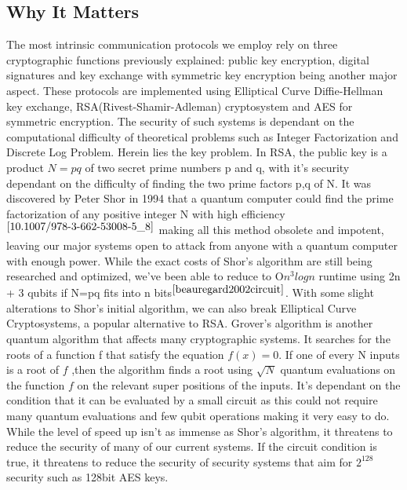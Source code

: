 \documentclass[10pt,a4paper]{IEEEtran}
\begin{document}
\subsection{Why It Matters}
The most intrinsic communication protocols we employ rely on three cryptographic functions previously explained: public key encryption, digital signatures and key exchange with symmetric key encryption being another major aspect. These protocols are implemented using Elliptical Curve Diffie-Hellman key exchange, RSA(Rivest-Shamir-Adleman) cryptosystem and AES for symmetric encryption. The security of such systems is dependant on the computational difficulty of theoretical problems such as Integer Factorization and Discrete Log Problem.
\newline
Herein lies the key problem. In RSA, the public key is a product \(N = pq\) of two secret prime numbers p and q, with it's security dependant on the difficulty of finding the two prime factors p,q of N. It was discovered by Peter Shor in 1994 that a quantum computer could find the prime factorization of any positive integer N with high efficiency\(^{\cite{10.1007/978-3-662-53008-5_8}}\) making all this method obsolete and impotent, leaving our major systems open to attack from anyone with a quantum computer with enough power. While the exact costs of Shor's algorithm are still being researched and optimized, we've been able to reduce to O\(n^3logn\) runtime using 2n + 3 qubits if N=pq fits into n bits\(^{\cite{beauregard2002circuit}}\). With some slight alterations to Shor's initial algorithm, we can also break Elliptical Curve Cryptosystems, a popular alternative to RSA. 
\newline
\newline
Grover's algorithm is another quantum algorithm that affects many cryptographic systems. It searches for the roots of a function f that satisfy the equation \(f(x) = 0\). If one of every N inputs is a root of \(f\) ,then the algorithm finds a root using \(\sqrt{N}\) quantum evaluations on the function \(f\) on the relevant super positions of the inputs. It's dependant on the condition that it can be evaluated by a small circuit as this could not require many quantum evaluations and few qubit operations making it very easy to do. While the level of speed up isn't as immense as Shor's algorithm, it threatens to reduce the security of many of our current systems. If the circuit condition is true, it threatens to reduce the security of security systems that aim for \(2^128\) security such as 128bit AES keys. 
\end{document}
